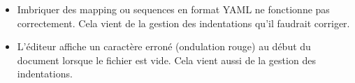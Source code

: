 \documentclass[
    iict, %
    il, %
]{heig-tb}
\begin{document}
\begin{itemize}
    \item Imbriquer des mapping ou sequences en format YAML ne fonctionne pas correctement. Cela vient de la gestion des indentations qu'il faudrait corriger.
    \item L'éditeur affiche un caractère erroné (ondulation rouge) au début du document lorsque le fichier est vide. Cela vient aussi de la gestion des indentations.
\end{itemize}




\label{glossaire}
\printnoidxglossary
{}

\printbibliography
{}

\end{document}
